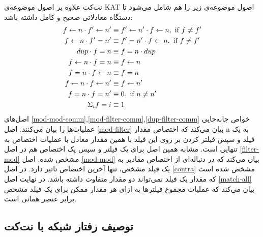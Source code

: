 نت‌کت علاوه بر اصول موضوعه‌ی
KAT
اصول‌ موضوعه‌ی زیر را هم شامل می‌شود تا دستگاه معادلاتی صحیح و کامل
داشته باشد:
\begin{align}
    f \leftarrow n \cdot f' \leftarrow n' & \equiv f' \leftarrow n' \cdot f \leftarrow n,
    \text{ if } f \neq f' \label{mod-mod-comm}
    \\
    f \leftarrow n \cdot f' = n'   & \equiv f' = n' \cdot f \leftarrow n,
    \text{ if } f \neq f' \label{mod-filter-comm}                            \\
    dup \cdot f = n         & \equiv f = n \cdot dup \label{dup-filter-comm} \\
    f \leftarrow n \cdot f = n     & \equiv f \leftarrow n \label{mod-filter}              \\
    f = n \cdot f \leftarrow n     & \equiv f = n \label{filter-mod}                \\
    f \leftarrow n \cdot f \leftarrow n'  & \equiv f \leftarrow n' \label{mod-mod}                \\
    f = n \cdot f = n'      & \equiv 0, \text{ if } n \neq n' \label{contra} \\
    \Sigma_{i} f = i        & \equiv 1 \label{match-all}
\end{align}
اصل‌های
\ref{mod-mod-comm},\ref{mod-filter-comm},\ref{dup-filter-comm}
خواص جابه‌جایی
 عملیات‌ها را بیان می‌کنند.
اصل
\ref{mod-filter}
بیان می‌کند که اختصاص مقدار
n
به یک فیلد و سپس  فیلتر کردن بر روی این فیلد با همین مقدار معادل با عملیات اختصاص
به تنهایی است.
مشابه همین اصل برای یک فیلتر و سپس یک اختصاص هم در اصل
\ref{filter-mod}
مشخص شده.
اصل
\ref{mod-mod}
بیان می‌کند که در دنباله‌ای از اختصاص مقادیر به یک فیلد مشخص، تنها آخرین اختصاص تاثیر دارد.
در اصل
\ref{contra}
مشخص شده است که مقدار یک فیلد نمی‌تواند دو مقدار متفاوت داشته باشد.
در نهایت اصل
\ref{match-all}
بیان می‌کند که عملیات مجموع فیلتر‌ها به ازای هر مقدار ممکن برای یک فیلد مشخص برابر عنصر همانی
است.

\subsection{توصیف رفتار شبکه با نت‌کت}

